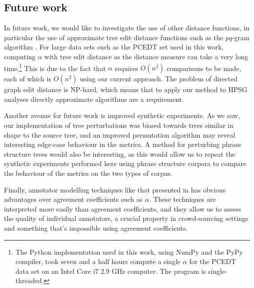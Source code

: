 \documentclass[11pt]{article}
\let\citeN=\newcite
\let\oldfrac=\frac
\renewcommand\frac[2]{\mathchoice{\oldfrac{#1}{#2}}{\nicefrac{#1}{#2}}{\nicefrac{#1}{#2}}{\nicefrac{#1}{#2}}}
\begin{document}
\subsection{Future work}
In future work, we would like to investigate the use of other distance
functions, in particular the use of approximate tree edit distance functions
such as the $pq$-gram algorithm \cite{Aug:Boh:Gam05}. For large data sets such
as the PCEDT set used in this work, computing $\alpha$ with tree edit distance
as the distance measure can take a very long time.\footnote{The Python
implementation used in this work, using NumPy and the PyPy compiler, took
seven and a half hours compute a single $\alpha$ for the PCEDT data set on an
Intel Core i7 2.9 GHz computer. The program is single-threaded.} This is due
to the fact that $\alpha$ requires $O(n^2)$ comparisons to be made, each of
which is $O(n^2)$ using our current approach. The problem of directed graph
edit distance is NP-hard, which means that to apply our method to HPSG
analyses directly approximate algorithms are a requirement.

Another avenue for future work is improved synthetic experiments. As we saw,
our implementation of tree perturbations was biased towards trees similar in
shape to the source tree, and an improved permutation algorithm may reveal
interesting edge-case behaviour in the metrics. A method for perturbing phrase
structure trees would also be interesting, as this would allow us to repeat the
synthetic experiments performed here using phrase structure corpora to compare
the behaviour of the metrics on the two types of corpus.

Finally, annotator modelling techniques like that presented in
\citeN{Pas:Car13} has obvious advantages over agreement coefficients such as
$\alpha$. These techniques are interpreted more easily than agreement
coefficients, and they allow us to assess the quality of individual
annotators, a crucial property in crowd-sourcing settings and something that's
impossible using agreement coefficients.

\end{document}
